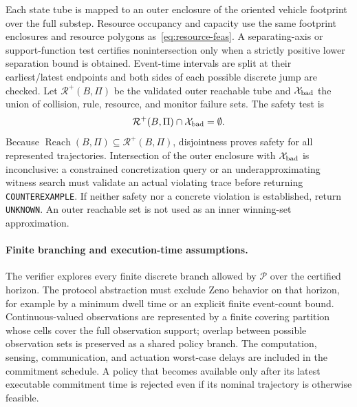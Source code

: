 \documentclass[letterpaper]{article} %
\begin{document}
Each state tube is mapped to an outer enclosure of the oriented vehicle footprint over the full substep. Resource occupancy and capacity use the same footprint enclosures and resource polygons as~\eqref{eq:resource-feas}. A separating-axis or support-function test certifies nonintersection only when a strictly positive lower separation bound is obtained. Event-time intervals are split at their earliest/latest endpoints and both sides of each possible discrete jump are checked. Let $\mathcal R^+(B,\Pi)$ be the validated outer reachable tube and $\mathcal X_{\rm bad}$ the union of collision, rule, resource, and monitor failure sets. The safety test is
\begin{equation}
\mathcal R^+(B,\Pi)\cap\mathcal X_{\rm bad}=\emptyset.
\label{eq:outer-safety-test}
\end{equation}
Because $\operatorname{Reach}(B,\Pi)\subseteq\mathcal R^+(B,\Pi)$, disjointness proves safety for all represented trajectories. Intersection of the outer enclosure with $\mathcal X_{\rm bad}$ is inconclusive: a constrained concretization query or an underapproximating witness search must validate an actual violating trace before returning \texttt{COUNTEREXAMPLE}. If neither safety nor a concrete violation is established, return \texttt{UNKNOWN}. An outer reachable set is not used as an inner winning-set approximation.

\paragraph{Finite branching and execution-time assumptions.}
The verifier explores every finite discrete branch allowed by $\mathcal P$ over the certified horizon. The protocol abstraction must exclude Zeno behavior on that horizon, for example by a minimum dwell time or an explicit finite event-count bound. Continuous-valued observations are represented by a finite covering partition whose cells cover the full observation support; overlap between possible observation sets is preserved as a shared policy branch. The computation, sensing, communication, and actuation worst-case delays are included in the commitment schedule. A policy that becomes available only after its latest executable commitment time is rejected even if its nominal trajectory is otherwise feasible.
\end{document}
